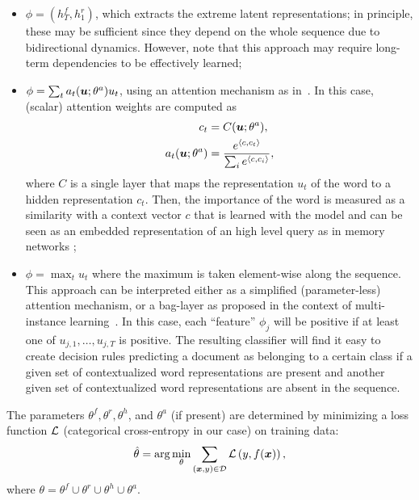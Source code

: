 \begin{itemize}
\item $\phi=(h^f_T,h^r_1)$, which
  extracts the extreme latent representations; in principle, these may
  be sufficient since they depend on the whole sequence due to 
  bidirectional dynamics. However, note that this approach may require
  long-term dependencies to be effectively learned;
\item
  $\phi = \sum_t a_t(\bm{u};\theta^a) u_t$,
  using an attention mechanism as in~\cite{yang_hierarchical_2016}. In
  this case, (scalar) attention weights are computed as
  \begin{align*}
    c_t&=C(\bm{u};\theta^a),\\
    a_t(\bm{u};\theta^a) &= \frac{e^{\langle c, c_t\rangle}}
    {\sum_i{e^{\langle c, c_i\rangle}}},\\
  \end{align*}
  where $C$ is a single layer that maps the representation $u_t$ of the
  word to a hidden representation $c_t$. Then, the importance of the word is
  measured as a similarity with a context vector $c$ that is learned
  with the model and can be seen as an embedded representation of an
  high level query as in memory networks \cite{sukhbaatar2015end};
\item $\phi = \max_t u_t$ where the maximum is taken element-wise
  along the sequence. This approach can be interpreted either as a
  simplified (parameter-less) attention mechanism, or a bag-layer as
  proposed in the context of multi-instance
  learning~\cite{tibo2017network}. In this case, each ``feature''
  $\phi_j$ will be positive if at least one of $u_{j,1},\dots,u_{j,T}$
  is positive. The resulting classifier will find it easy to create
  decision rules predicting a document as belonging to a certain class
  if a given set of contextualized word representations are present
  and another given set of contextualized word representations are
  absent in the sequence.
\end{itemize}

The parameters $\theta^f,\theta^r,\theta^h$, and $\theta^a$ (if
present) are determined by minimizing a loss function $\mathcal{L}$
(categorical cross-entropy in our case) on training data:
\begin{equation}
  \hat \theta = \mathrm{arg}\min_\theta\sum_{(\bm{x},y)\in\mathcal{D}}\mathcal{L}\left(y,f(\bm{x})\right),
\end{equation}
where $\theta=\theta^f\cup\theta^r\cup\theta^h\cup\theta^a$.

